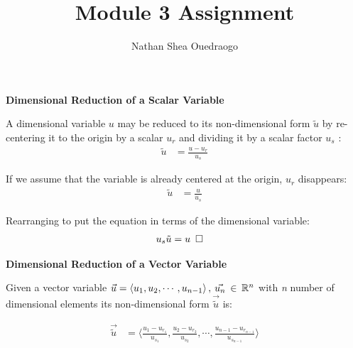 \documentclass[titlepage]{article}
\begin{document}

\title{\textbf{Module 3 Assignment}}
\author{Nathan Shea Ouedraogo}
\date{}
\maketitle


    \section{}
    \begin{center}
        \large
        \textbf{Dimensional Reduction of a Scalar Variable}
    \end{center}
    \normalsize

    \noindent A dimensional variable $u$ may be reduced to its non-dimensional form $\tilde{u}$ by re-centering it to the origin by a scalar $u_{r}$ and dividing it by a scalar factor $u_{s}$ :
    \begin{align}
        \tilde{u} &= \displaystyle\frac{u-u_{r}}{u_{s}}
    \end{align}

    \noindent If we assume that the variable is already centered at the origin, $u_{r}$ disappears:
    \begin{align}
        \tilde{u} &= \displaystyle\frac{u}{u_{s}}
    \end{align}

    \noindent Rearranging to put the equation in terms of the dimensional variable: 
    \begin{align}
        u_{s}\tilde{u} &= u\hspace*{5pt}\square
    \end{align}

    \begin{center}
        \large
        \textbf{Dimensional Reduction of a Vector Variable}
    \end{center}
    \normalsize

    \noindent Given a vector variable 
    $\vec{u}=\left<u_{1},u_{2},\cdots,u_{n-1}\right>,\hspace*{2pt}\vec{u_{n}}\hspace*{2pt}\in\hspace*{2pt}\mathbb{R}^n$ 
    with \emph{n} number of dimensional elements its non-dimensional form $\vec{\tilde{u}}$ is:

    \begin{align}
        \vec{\tilde{u}} &= \langle{\displaystyle\frac{u_{1}-u_{r_{1}}}{u_{s_{1}}}, \displaystyle\frac{u_{2}-u_{r_{2}}}{u_{s_{2}}}, \cdots, \displaystyle\frac{u_{n-1}-u_{r_{n-1}}}{u_{s_{n-1}}}}\rangle
    \end{align}
\end{document}
